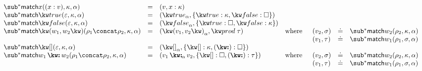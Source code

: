 $\begin{array}{lllll}
   \matchBwdF{\matchVar{x}}(\bind{x}{v}, \kappa, \alpha)
   &=&
   (v, \elimVar{x}{\kappa})
   \\
   \matchBwdF{\matchTrue}(\seqEmpty, \kappa, \alpha)
   &=&
   (\annTrue{\alpha}, \elimBool{\kappa}{\hole})
   \\
   \matchBwdF{\matchFalse}(\seqEmpty, \kappa, \alpha)
   &=&
   (\annFalse{\alpha}, \elimBool{\hole}{\kappa})
   \\
   \matchBwdF{\matchPair{w_1}{w_2}}(\rho_1 \concat \rho_2, \kappa, \alpha)
   &=&
   (\annPair{v_1}{v_2}{\alpha}, \elimProd{\tau})
   &\text{where}&
   \begin{array}[t]{lll}
      (v_2, \sigma) &\eq& \matchBwdF{w_2}(\rho_2, \kappa, \alpha)
      \\
      (v_1, \tau) &\eq& \matchBwdF{w_1}(\rho_1, \sigma, \alpha)
   \end{array}
   \\
   \matchBwdF{\matchNil}(\seqEmpty,\kappa,\alpha)
   &=&
   (\annNil{\alpha}, \elimList{\kappa}{\hole})
   \\
   \matchBwdF{\matchCons{w_1}{w_2}}(\rho_1 \concat \rho_2, \kappa, \alpha)
   &=&
   (\annCons{v_1}{v_2}{\alpha}, \elimList{\hole}{\tau})
   &\text{where}&
   \begin{array}[t]{lll}
      (v_2, \sigma) &\eq& \matchBwdF{w_2}(\rho_2, \kappa, \alpha)
      \\
      (v_1, \tau) &\eq& \matchBwdF{w_1}(\rho_1, \sigma, \alpha)
   \end{array}
\end{array}$
